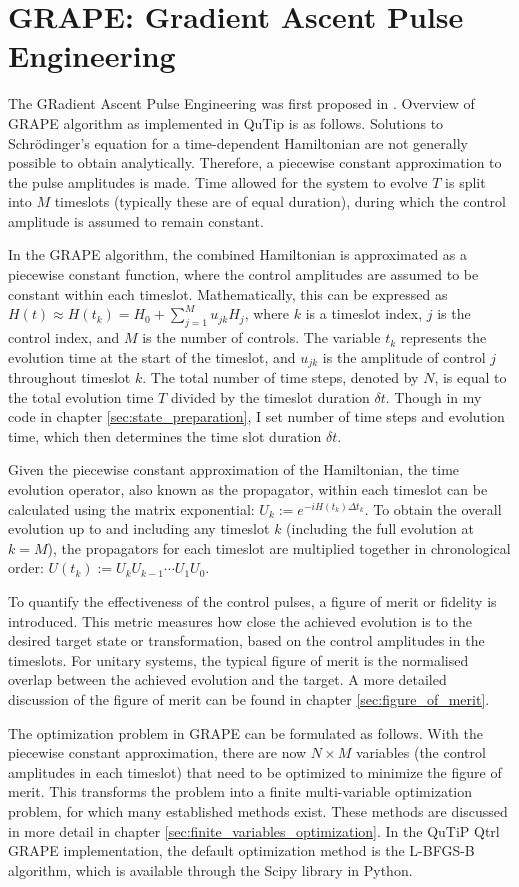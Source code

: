 \documentclass[12pt]{report}
\begin{document}
\section{GRAPE: Gradient Ascent Pulse Engineering}
The GRadient Ascent Pulse Engineering was first proposed in \cite{KHANEJA2005296}. 
Overview of GRAPE algorithm as implemented in QuTip is as follows. 
Solutions to Schrödinger's equation for a time-dependent Hamiltonian are not generally possible to obtain analytically. 
Therefore, a piecewise constant approximation to the pulse amplitudes is made. Time allowed for the system to evolve $T$ is split into $M$ timeslots (typically these are of equal duration), during which the control amplitude is assumed to remain constant. 
\par
In the GRAPE algorithm, the combined Hamiltonian is approximated as a piecewise constant function, where the control amplitudes are assumed to be constant within each timeslot. 
Mathematically, this can be expressed as $H(t) \approx H\left(t_k\right)=H_0+\sum_{j=1}^M u_{j k} H_j$, where $k$ is a timeslot index, $j$ is the control index, and $M$ is the number of controls. 
The variable $t_k$ represents the evolution time at the start of the timeslot, and $u_{jk}$ is the amplitude of control $j$ throughout timeslot $k$. 
The total number of time steps, denoted by $N$, is equal to the total evolution time $T$ divided by the timeslot duration $\delta t$.
Though in my code in chapter \ref{sec:state_preparation}, I set number of time steps and evolution time, which then determines the time slot duration $\delta t$.
\par
Given the piecewise constant approximation of the Hamiltonian, the time evolution operator, also known as the propagator, within each timeslot can be calculated using the matrix exponential: $U_k:=e^{-i H\left(t_k\right) \Delta t_k}$. 
To obtain the overall evolution up to and including any timeslot $k$ (including the full evolution at $k=M$), the propagators for each timeslot are multiplied together in chronological order: $U\left(t_k\right):=U_k U_{k-1} \cdots U_1 U_0$.
\par
To quantify the effectiveness of the control pulses, a figure of merit or fidelity is introduced. 
This metric measures how close the achieved evolution is to the desired target state or transformation, based on the control amplitudes in the timeslots. 
For unitary systems, the typical figure of merit is the normalised overlap between the achieved evolution and the target. 
A more detailed discussion of the figure of merit can be found in chapter \ref{sec:figure_of_merit}.
\par
The optimization problem in GRAPE can be formulated as follows. 
With the piecewise constant approximation, there are now $N\times M$ variables (the control amplitudes in each timeslot) that need to be optimized to minimize the figure of merit. 
This transforms the problem into a finite multi-variable optimization problem, for which many established methods exist. 
These methods are discussed in more detail in chapter \ref{sec:finite_variables_optimization}. In the QuTiP Qtrl GRAPE implementation, the default optimization method is the L-BFGS-B algorithm, which is available through the Scipy library in Python.
\end{document}
